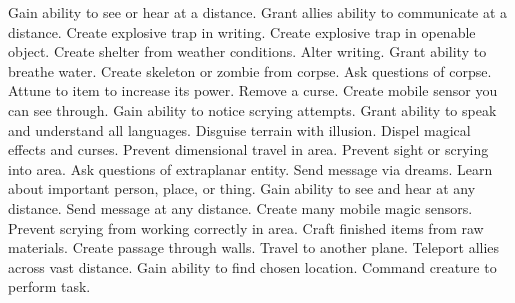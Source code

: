     {Gain ability to see or hear at a distance.}
    {Grant allies ability to communicate at a distance.}
    {Create explosive trap in writing.}
    {Create explosive trap in openable object.}
    {Create shelter from weather conditions.}
    {Alter writing.}
    {Grant ability to breathe water.}
    {Create skeleton or zombie from corpse.}
    {Ask questions of corpse.}
    {Attune to item to increase its power.}
    {Remove a curse.}
    {Create mobile sensor you can see through.}
    {Gain ability to notice scrying attempts.}
    {Grant ability to speak and understand all languages.}
    {Disguise terrain with illusion.}
    {Dispel magical effects and curses.}
    {Prevent dimensional travel in area.}
    {Prevent sight or scrying into area.}
    {Ask questions of extraplanar entity.}
    {Send message via dreams.}
    {Learn about important person, place, or thing.}
    {Gain ability to see and hear at any distance.}
    {Send message at any distance.}
    {Create many mobile magic sensors.}
    {Prevent scrying from working correctly in area.}
    {Craft finished items from raw materials.}
    {Create passage through walls.}
    {Travel to another plane.}
    {Teleport allies across vast distance.}
    {Gain ability to find chosen location.}
    {Command creature to perform task.}
